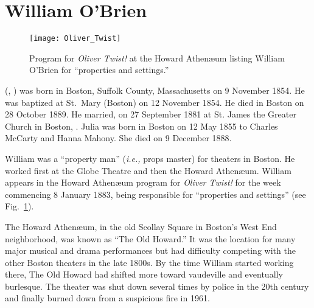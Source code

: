 \section{William O'Brien}\label{per:William3OBrien}

\begin{figure}[p]
	\centering
	\texttt{[image: Oliver\_Twist]}
	\caption{Program for \textit{Oliver Twist!} at the Howard Athen\ae um listing William O'Brien for ``properties and settings.''}
	\label{fig:OliverTwist}
\end{figure}

 (, ) was born in Boston, Suffolk County, Massachusetts on 9 November 1854.\cite{William3OBrienBirth} He was baptized at St.\ Mary (Boston) on 12 November 1854.\cite{William3OBrienBaptism} He died in Boston on 28 October 1889.\cite{William3OBrienDeath:1} He married, on 27 September 1881 at St. James the Greater Church in Boston, .\cite{William3OBrienMarriage} Julia was born in Boston on 12 May 1855 to Charles McCarty and Hanna Mahony.\cite{JuliaMcCartyBaptism} She died on 9 December 1888.\cite{JuliaMcCartyDeath:1}

William was a ``property man'' (\textit{i.e.,} props master\cite{PropertyMan}) for theaters in Boston. He worked first at the Globe Theatre\cite{WilliamOBrien1880} and then the Howard Athen\ae um.\cite{WilliamOBrien1883} William appears in the Howard Athen\ae um program for \textit{Oliver Twist!} for the week commencing 8 January 1883, being responsible for ``properties and settings''\cite{William3OBrienProgram} (see Fig.\ \ref{fig:OliverTwist}).

The Howard Athen\ae um, in the old Scollay Square in Boston's West End neighborhood, was known as ``The Old Howard.'' It was the location for many major musical and drama performances but had difficulty competing with the other Boston theaters in the late 1800s. By the time William started working there, The Old Howard had shifted more toward vaudeville and eventually burlesque. The theater was shut down several times by police in the 20th century and finally burned down from a suspicious fire in 1961.\cite{HowardAthenaeum}

